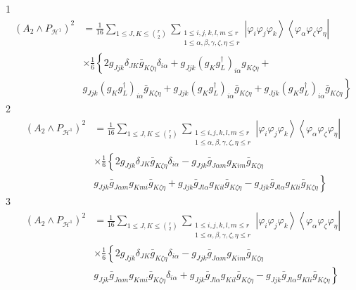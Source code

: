 \documentclass[aps,preprint]{revtex4}%
\begin{document}
1%
\begin{align}
\left(  A_{2}\wedge P_{\mathcal{H}^{1}}\right)  ^{2} &  =\frac{1}{16}%
\sum_{1\leq J,K\leq\binom{r}{2}}\sum_{\substack{1\leq i,j,k,l,m\leq
r\\1\leq\alpha,\beta,\gamma,\zeta,\eta\leq r}}\left\vert \varphi_{i}%
\varphi_{j}\varphi_{k}\right\rangle \left\langle \varphi_{\alpha}%
\varphi_{\zeta}\varphi_{\eta}\right\vert \\
&  \times\frac{1}{6}\left\{  2g_{Jjk}\delta_{JK}\bar{g}_{K\zeta\eta}%
\delta_{i\alpha}+g_{Jjk}\left(  g_{K}g_{L}^{\dagger}\right)  _{i\alpha
}g_{K\zeta\eta}+\right.  \\
&  \left.  g_{Jjk}\left(  g_{K}g_{L}^{\dagger}\right)  _{i\alpha}\bar
{g}_{K\zeta\eta}+g_{Jjk}\left(  g_{K}g_{L}^{\dagger}\right)  _{i\alpha}\bar
{g}_{K\zeta\eta}+g_{Jjk}\left(  g_{K}g_{L}^{\dagger}\right)  _{i\alpha}\bar
{g}_{K\zeta\eta}\right\}
\end{align}
2%
\begin{align}
\left(  A_{2}\wedge P_{\mathcal{H}^{1}}\right)  ^{2} &  =\frac{1}{16}%
\sum_{1\leq J,K\leq\binom{r}{2}}\sum_{\substack{1\leq i,j,k,l,m\leq
r\\1\leq\alpha,\beta,\gamma,\zeta,\eta\leq r}}\left\vert \varphi_{i}%
\varphi_{j}\varphi_{k}\right\rangle \left\langle \varphi_{\alpha}%
\varphi_{\zeta}\varphi_{\eta}\right\vert \\
&  \times\frac{1}{6}\left\{  2g_{Jjk}\delta_{JK}\bar{g}_{K\zeta\eta}%
\delta_{i\alpha}-g_{Jjk}\bar{g}_{J\alpha m}g_{Kim}\bar{g}_{K\zeta\eta}\right.
\\
&  \left.  g_{Jjk}\bar{g}_{J\alpha m}g_{Kmi}\bar{g}_{K\zeta\eta}+g_{Jjk}%
\bar{g}_{Jl\alpha}g_{Kil}\bar{g}_{K\zeta\eta}-g_{Jjk}\bar{g}_{Jl\alpha}%
g_{Kli}\bar{g}_{K\zeta\eta}\right\}
\end{align}
3%
\begin{align}
\left(  A_{2}\wedge P_{\mathcal{H}^{1}}\right)  ^{2} &  =\frac{1}{16}%
\sum_{1\leq J,K\leq\binom{r}{2}}\sum_{\substack{1\leq i,j,k,l,m\leq
r\\1\leq\alpha,\beta,\gamma,\zeta,\eta\leq r}}\left\vert \varphi_{i}%
\varphi_{j}\varphi_{k}\right\rangle \left\langle \varphi_{\alpha}%
\varphi_{\zeta}\varphi_{\eta}\right\vert \\
&  \times\frac{1}{6}\left\{  2g_{Jjk}\delta_{JK}\bar{g}_{K\zeta\eta}%
\delta_{i\alpha}-g_{Jjk}\bar{g}_{J\alpha m}g_{Kim}\bar{g}_{K\zeta\eta}\right.
\\
&  g_{Jjk}\bar{g}_{J\alpha m}g_{Kmi}\bar{g}_{K\zeta\eta}\left.  \delta
_{i\alpha}+g_{Jjk}\bar{g}_{Jl\alpha}g_{Kil}\bar{g}_{K\zeta\eta}-g_{Jjk}\bar
{g}_{Jl\alpha}g_{Kli}\bar{g}_{K\zeta\eta}\right\}
\end{align}
\end{document}
